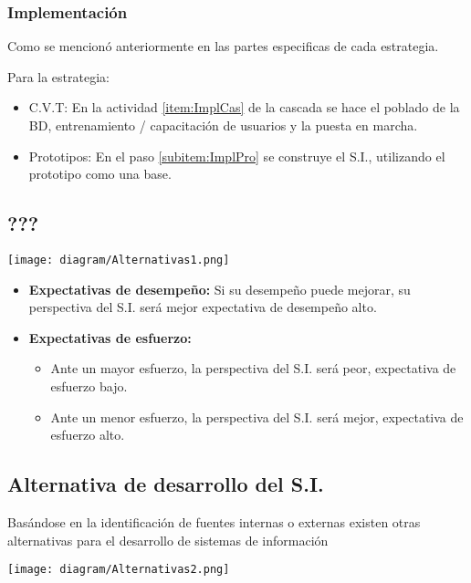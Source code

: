 \documentclass{templateNote}
\begin{document}
\subsubsection{Implementaci\'on}
Como se mencion\'o anteriormente en las partes especificas de cada estrategia.

Para la estrategia:
\begin{itemize}
    \item C.V.T: En la actividad \ref{item:ImplCas} de la cascada se hace el poblado de la BD, entrenamiento / capacitaci\'on de usuarios y la puesta en marcha.
    \item Prototipos: En el paso \ref{subitem:ImplPro} se construye el S.I., utilizando el prototipo como una base.
\end{itemize}

\newpage
\subsection{???}
\begin{center}
    \texttt{[image: diagram/Alternativas1.png]}
\end{center}
\begin{itemize}
    \item \textbf{Expectativas de desempe\~no:} Si su desempe\~no puede mejorar, su perspectiva del S.I. ser\'a mejor expectativa de desempe\~no alto.
    \item \textbf{Expectativas de esfuerzo:}
    \begin{itemize}
        \item Ante un mayor esfuerzo, la perspectiva del S.I. ser\'a peor, expectativa de esfuerzo bajo.
        \item Ante un menor esfuerzo, la perspectiva del S.I. ser\'a mejor, expectativa de esfuerzo alto.
    \end{itemize} 
\end{itemize}
\subsection{Alternativa de desarrollo del S.I.}

\noindent Basándose en la identificación de fuentes internas o externas existen otras alternativas para el desarrollo de sistemas de información
\begin{center}
    \texttt{[image: diagram/Alternativas2.png]}
\end{center}
\end{document}
